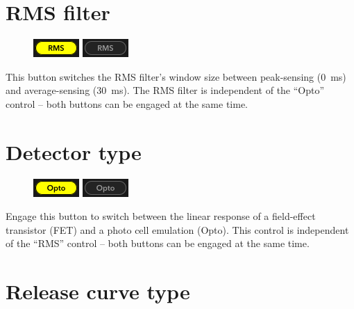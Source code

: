 \section{RMS filter}

\begin{figure}
  \includegraphics[scale=\screenshotscale,clip]{include/images/button_rms_on.png}
  \newline \vspace{-0.9\baselineskip}
  \includegraphics[scale=\screenshotscale,clip]{include/images/button_rms_off.png}
\end{figure}

This button switches the RMS filter's window size between peak-sensing
(\SI{0}{\milli\second}) and average-sensing (\SI{30}{\milli\second}).
The RMS filter is independent of the ``Opto'' control -- both buttons
can be engaged at the same time.

\section{Detector type}

\begin{figure}
  \includegraphics[scale=\screenshotscale,clip]{include/images/button_opto_on.png}
  \newline \vspace{-0.9\baselineskip}
  \includegraphics[scale=\screenshotscale,clip]{include/images/button_opto_off.png}
\end{figure}

Engage this button to switch between the linear response of a
field-effect transistor (FET) and a photo cell emulation (Opto).  This
control is independent of the ``RMS'' control -- both buttons can be
engaged at the same time.

\section{Release curve type}

